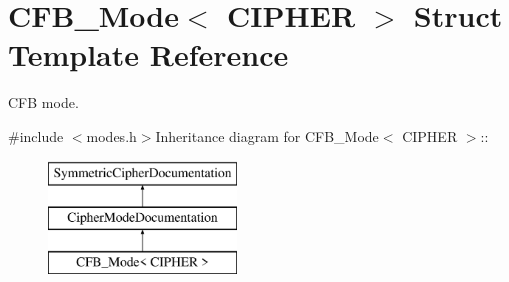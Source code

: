 \hypertarget{struct_c_f_b___mode}{
\section{CFB\_\-Mode$<$ CIPHER $>$ Struct Template Reference}
\label{struct_c_f_b___mode}
}


CFB mode.  


{\ttfamily \#include $<$modes.h$>$}Inheritance diagram for CFB\_\-Mode$<$ CIPHER $>$::\begin{figure}[H]
\begin{center}
\leavevmode
\includegraphics[height=3cm]{struct_c_f_b___mode}
\end{center}
\end{figure}
